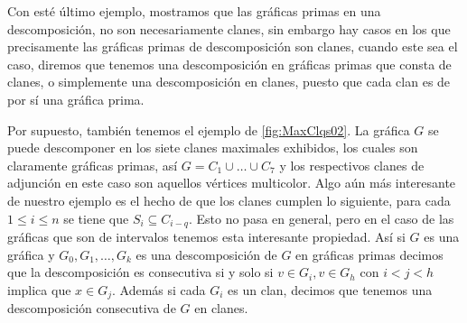 Con esté último ejemplo, mostramos que las gráficas primas en una descomposición, no son necesariamente clanes, sin embargo hay casos en los que precisamente las gráficas primas de descomposición son clanes, cuando este sea el caso, diremos que tenemos una descomposición en gráficas primas que consta de clanes, o simplemente una descomposición en clanes, puesto que cada clan es de por sí una gráfica prima.

Por supuesto, también tenemos el ejemplo de \cref{fig:MaxClqs02}. La gr\'afica $G$ se puede descomponer en los siete clanes maximales exhibidos, los cuales son claramente gráficas primas, así $G=C_1 \cup \dots \cup C_7$ y los respectivos clanes de adjunci\'on en este caso son aquellos v\'ertices multicolor. Algo aún más interesante de nuestro ejemplo es el hecho de que los clanes cumplen lo siguiente, para cada $1\leq i\leq n$ se tiene que $S_i\subseteq C_{i-q}$. Esto no pasa en general, pero en el caso de las gr\'aficas que son de intervalos tenemos esta interesante propiedad. Así si $G$ es una gráfica y $G_0,G_1,\dots,G_k$ es una descomposición de $G$ en gráficas primas decimos que la descomposición es consecutiva si y solo si $v\in G_i, v\in G_h$ con $i<j<h$ implica que $x\in G_j$. Además si cada $G_i $ es un clan, decimos que tenemos una descomposici\'on consecutiva de $G$ en clanes.

